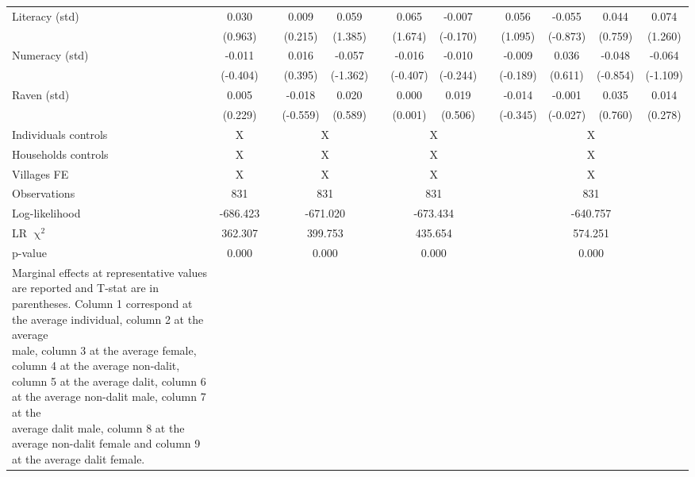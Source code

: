\begin{table}[htbp]
{\begin{tabular}{lcccccccccccc}
    Literacy (std) & 0.030 &   & 0.009 & 0.059 &   & 0.065 & -0.007 &   & 0.056 & -0.055 & 0.044 & 0.074 \\
      & (0.963) &   & (0.215) & (1.385) &   & (1.674) & (-0.170) &   & (1.095) & (-0.873) & (0.759) & (1.260) \\
    Numeracy (std) & -0.011 &   & 0.016 & -0.057 &   & -0.016 & -0.010 &   & -0.009 & 0.036 & -0.048 & -0.064 \\
      & (-0.404) &   & (0.395) & (-1.362) &   & (-0.407) & (-0.244) &   & (-0.189) & (0.611) & (-0.854) & (-1.109) \\
    Raven (std) & 0.005 &   & -0.018 & 0.020 &   & 0.000 & 0.019 &   & -0.014 & -0.001 & 0.035 & 0.014 \\
      & (0.229) &   & (-0.559) & (0.589) &   & (0.001) & (0.506) &   & (-0.345) & (-0.027) & (0.760) & (0.278) \\
\cmidrule{1-2}\cmidrule{4-5}\cmidrule{7-8}\cmidrule{10-13} 
    Individuals controls & X     &       & \multicolumn{2}{c}{X} &       & \multicolumn{2}{c}{X} &       & \multicolumn{4}{c}{X} \\
    Households controls & X     &       & \multicolumn{2}{c}{X} &       & \multicolumn{2}{c}{X} &       & \multicolumn{4}{c}{X} \\
    Villages FE & X     &       & \multicolumn{2}{c}{X} &       & \multicolumn{2}{c}{X} &       & \multicolumn{4}{c}{X} \\
    \midrule
    Observations & 831   &       & \multicolumn{2}{c}{831} &       & \multicolumn{2}{c}{831} &       & \multicolumn{4}{c}{831} \\
    Log-likelihood & -686.423 &       & \multicolumn{2}{c}{-671.020} &       & \multicolumn{2}{c}{-673.434} &       & \multicolumn{4}{c}{-640.757} \\
    LR $\upchi^2$ & 362.307 &       & \multicolumn{2}{c}{399.753} &       & \multicolumn{2}{c}{435.654} &       & \multicolumn{4}{c}{574.251} \\
    p-value & 0.000 &       & \multicolumn{2}{c}{0.000} &       & \multicolumn{2}{c}{0.000} &       & \multicolumn{4}{c}{0.000} \\
    \bottomrule
	\Tablenote{13}{
	Marginal effects at representative values are reported and T-stat are in parentheses. Column 1 correspond at the average individual, column 2 at the average \\ 
	male, column 3 at the average female, column 4 at the average non-dalit, column 5 at the average dalit, column 6 at the average non-dalit male, column 7 at the \\ 
	average dalit male, column 8 at the average non-dalit female and column 9 at the average dalit female.} \\
    \end{tabular}%
    }
  \label{tab:ame_debtpath}%
\end{table}%


